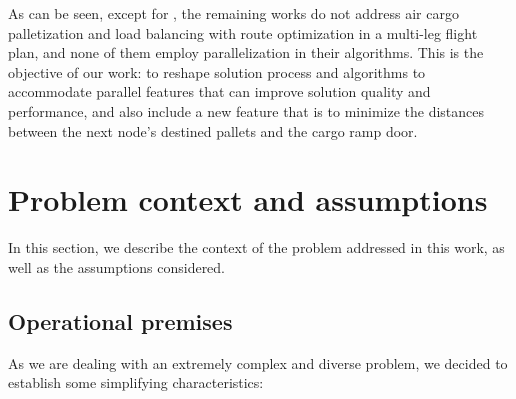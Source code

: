 \documentclass[preprint,authoryear]{elsarticle}
\begin{document}
As can be seen, except for \cite{MesquitaSanches2023}, the remaining works do not address air cargo palletization and load balancing with route optimization in a multi-leg flight plan, and none of them employ parallelization in their algorithms. This is the objective of our work: to reshape \cite{MesquitaSanches2023} solution process and algorithms to accommodate parallel features that can improve solution quality and performance, and also include a new feature that is to minimize the distances between the next node's destined pallets and the cargo ramp door.


\section{Problem context and assumptions}
\label{sec3}

In this section, we describe the context of the problem addressed in this work, as well as the assumptions considered.

\subsection{Operational premises}

As we are dealing with an extremely complex and diverse problem, we decided to establish some simplifying characteristics:
\end{document}
